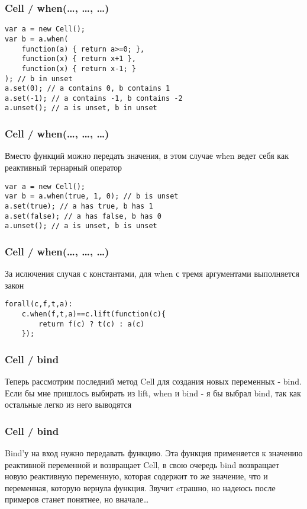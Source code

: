 \documentclass[xetex]{beamer}
\begin{document}
\begin{frame}[fragile]
\frametitle{Cell / when(\dots, \dots, \dots)}
\begin{lstlisting}
var a = new Cell();
var b = a.when(
    function(a) { return a>=0; }, 
    function(x) { return x+1 },
    function(x) { return x-1; }
); // b in unset
a.set(0); // a contains 0, b contains 1
a.set(-1); // a contains -1, b contains -2
a.unset(); // a is unset, b in unset
\end{lstlisting}
\end{frame}


\begin{frame}[fragile]
\frametitle{Cell / when(\dots, \dots, \dots)}
Вместо функций можно передать значения, в этом случае when ведет себя как реактивный тернарный оператор

\vspace{10mm}
\begin{lstlisting}
var a = new Cell();
var b = a.when(true, 1, 0); // b is unset
a.set(true); // a has true, b has 1
a.set(false); // a has false, b has 0
a.unset(); // a is unset, b is unset
\end{lstlisting}
\end{frame}


\begin{frame}[fragile]
\frametitle{Cell / when(\dots, \dots, \dots)}
За ислючения случая с константами, для when с тремя аргументами выполняется закон

\vspace{10mm}
\begin{lstlisting}
forall(c,f,t,a):
    c.when(f,t,a)==c.lift(function(c){ 
        return f(c) ? t(c) : a(c) 
    });
\end{lstlisting}
\end{frame}


\begin{frame}[fragile]
\frametitle{Cell / bind}
Теперь рассмотрим последний метод Cell для создания новых переменных - bind. Если бы мне пришлось выбирать из lift, when и bind - я бы выбрал bind, так как остальные легко из него выводятся
\end{frame}


\begin{frame}[fragile]
\frametitle{Cell / bind}
Bind’у на вход нужно передавать функцию. Эта функция применяется к значению реактивной переменной и возвращает Cell, в свою очередь bind возвращает новую реактивную переменную, которая содержит то же значение, что и переменная, которую вернула функция. Звучит cтрашно, но надеюсь после примеров станет понятнее, но вначале\dots
\end{frame}
\end{document}
